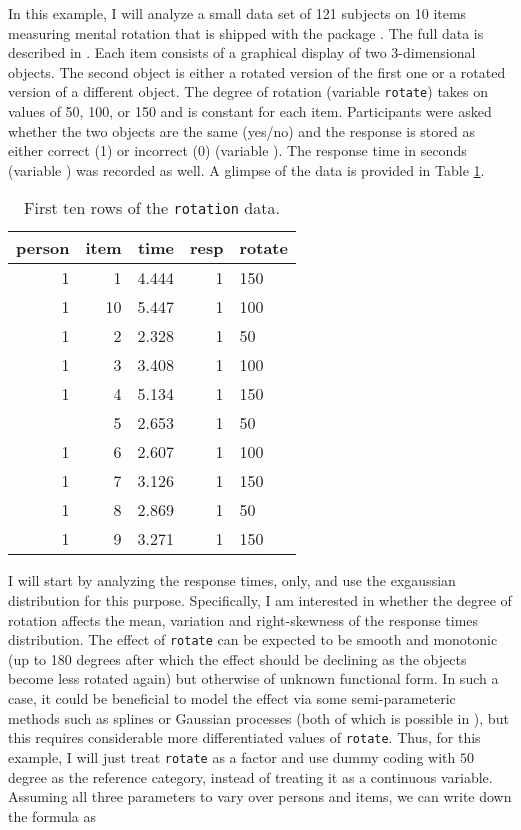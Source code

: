 \documentclass[
]{jss}
\begin{document}
In this example, I will analyze a small data set of 121 subjects on 10
items measuring mental rotation that is shipped with the 
package \citetext{\citealp{diffIRT}; \citealp[see
also][]{vandermaas2011}}. The full data is described in
\citet{borst2011}. Each item consists of a graphical display of two
3-dimensional objects. The second object is either a rotated version of
the first one or a rotated version of a different object. The degree of
rotation (variable \texttt{rotate}) takes on values of 50, 100, or 150
and is constant for each item. Participants were asked whether the two
objects are the same (yes/no) and the response is stored as either
correct (1) or incorrect (0) (variable ). The response time
in seconds (variable ) was recorded as well. A glimpse of the
data is provided in Table \ref{tab:head-rotation}.

\begin{CodeChunk}
\begin{table}

\caption{\label{tab:head-rotation}First ten rows of the \texttt{rotation} data.}
\centering
\begin{tabular}[t]{rrrrl}
\toprule
person & item & time & resp & rotate\\
\midrule
1 & 1 & 4.444 & 1 & 150\\
1 & 10 & 5.447 & 1 & 100\\
1 & 2 & 2.328 & 1 & 50\\
1 & 3 & 3.408 & 1 & 100\\
1 & 4 & 5.134 & 1 & 150\\
\addlinespace
1 & 5 & 2.653 & 1 & 50\\
1 & 6 & 2.607 & 1 & 100\\
1 & 7 & 3.126 & 1 & 150\\
1 & 8 & 2.869 & 1 & 50\\
1 & 9 & 3.271 & 1 & 150\\
\bottomrule
\end{tabular}
\end{table}

\end{CodeChunk}

I will start by analyzing the response times, only, and use the
exgaussian distribution for this purpose. Specifically, I am interested
in whether the degree of rotation affects the mean, variation and
right-skewness of the response times distribution. The effect of
\texttt{rotate} can be expected to be smooth and monotonic (up to 180
degrees after which the effect should be declining as the objects become
less rotated again) but otherwise of unknown functional form. In such a
case, it could be beneficial to model the effect via some
semi-parameteric methods such as splines or Gaussian processes (both of
which is possible in ), but this requires considerable more
differentiated values of \texttt{rotate}. Thus, for this example, I will
just treat \texttt{rotate} as a factor and use dummy coding with \(50\)
degree as the reference category, instead of treating it as a continuous
variable. Assuming all three parameters to vary over persons and items,
we can write down the formula as
\end{document}
